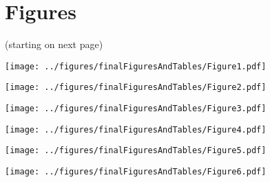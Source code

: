\documentclass[12pt,english]{article}
\theoremstyle{remark}
\begin{document}






















\pagebreak

\section{Figures}

(starting on next page)

\begin{sidewaysfigure}
	\texttt{[image: ../figures/finalFiguresAndTables/Figure1.pdf]}
\end{sidewaysfigure}

\begin{sidewaysfigure}
	\texttt{[image: ../figures/finalFiguresAndTables/Figure2.pdf]}
\end{sidewaysfigure}

\begin{sidewaysfigure}
	\texttt{[image: ../figures/finalFiguresAndTables/Figure3.pdf]}
\end{sidewaysfigure}

\begin{sidewaysfigure}
	\texttt{[image: ../figures/finalFiguresAndTables/Figure4.pdf]}
\end{sidewaysfigure}

\begin{sidewaysfigure}
	\texttt{[image: ../figures/finalFiguresAndTables/Figure5.pdf]}
\end{sidewaysfigure}

\begin{sidewaysfigure}
	\texttt{[image: ../figures/finalFiguresAndTables/Figure6.pdf]}
\end{sidewaysfigure}
\end{document}
